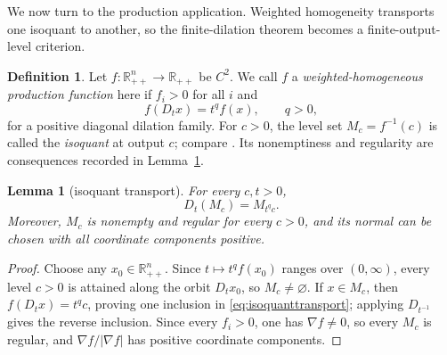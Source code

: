 \documentclass[preprint,12pt]{elsarticle}
\numberwithin{equation}{section}
\newtheorem{lemma}[theorem]{Lemma}
\theoremstyle{definition}\newtheorem{definition}[theorem]{Definition}
\theoremstyle{remark}\newtheorem{remark}[theorem]{Remark}
\begin{document}
We now turn to the production application. Weighted homogeneity transports one isoquant to another, so the finite-dilation theorem becomes a finite-output-level criterion.

\begin{definition}\label{def:production}
Let $f:\mathbb R_{++}^n\to\mathbb R_{++}$ be $C^2$. We call $f$ a \emph{weighted-homogeneous production function} here if $f_i>0$ for all $i$ and
\begin{equation}\label{eq:weightedhom}
f(D_tx)=t^qf(x),\qquad q>0,
\end{equation}
for a positive diagonal dilation family. For $c>0$, the level set $M_c=f^{-1}(c)$ is called the \emph{isoquant} at output $c$; compare \cite{VilcuVilcu2019,NeacsuEtAl2024,Lloyd2012}. Its nonemptiness and regularity are consequences recorded in Lemma~\ref{lem:isoquanttransport}.
\end{definition}

\begin{lemma}[isoquant transport]\label{lem:isoquanttransport}
For every $c,t>0$,
\begin{equation}\label{eq:isoquanttransport}
D_t(M_c)=M_{t^qc}.
\end{equation}
Moreover, $M_c$ is nonempty and regular for every $c>0$, and its normal can be chosen with all coordinate components positive.
\end{lemma}
\begin{proof}
Choose any $x_0\in\mathbb R_{++}^n$. Since $t\mapsto t^qf(x_0)$ ranges over $(0,\infty)$, every level $c>0$ is attained along the orbit $D_tx_0$, so $M_c\ne\varnothing$. If $x\in M_c$, then $f(D_tx)=t^qc$, proving one inclusion in \eqref{eq:isoquanttransport}; applying $D_{t^{-1}}$ gives the reverse inclusion. Since every $f_i>0$, one has $\nabla f\ne0$, so every $M_c$ is regular, and $\nabla f/|\nabla f|$ has positive coordinate components.
\end{proof}
\end{document}
